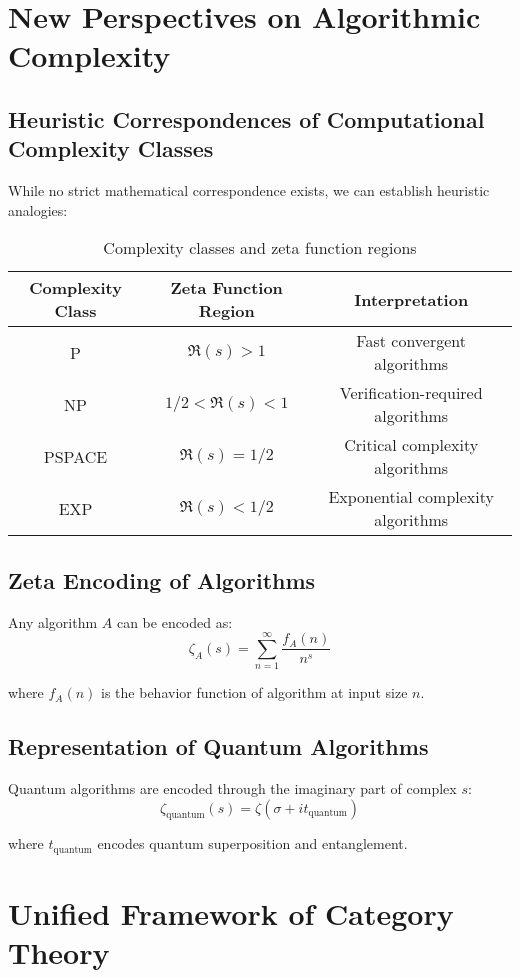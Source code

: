 \documentclass[11pt]{article}
\begin{document}
\section{New Perspectives on Algorithmic Complexity}

\subsection{Heuristic Correspondences of Computational Complexity Classes}

While no strict mathematical correspondence exists, we can establish heuristic analogies:

\begin{table}[h]
\centering
\begin{tabular}{|c|c|c|}
\hline
Complexity Class & Zeta Function Region & Interpretation \\
\hline
P & $\Re(s) > 1$ & Fast convergent algorithms \\
NP & $1/2 < \Re(s) < 1$ & Verification-required algorithms \\
PSPACE & $\Re(s) = 1/2$ & Critical complexity algorithms \\
EXP & $\Re(s) < 1/2$ & Exponential complexity algorithms \\
\hline
\end{tabular}
\caption{Complexity classes and zeta function regions}
\end{table}

\subsection{Zeta Encoding of Algorithms}

Any algorithm $A$ can be encoded as:
$$\zeta_A(s) = \sum_{n=1}^{\infty} \frac{f_A(n)}{n^s}$$

where $f_A(n)$ is the behavior function of algorithm at input size $n$.

\subsection{Representation of Quantum Algorithms}

Quantum algorithms are encoded through the imaginary part of complex $s$:
$$\zeta_{\text{quantum}}(s) = \zeta(\sigma + it_{\text{quantum}})$$

where $t_{\text{quantum}}$ encodes quantum superposition and entanglement.

\section{Unified Framework of Category Theory}
\end{document}
